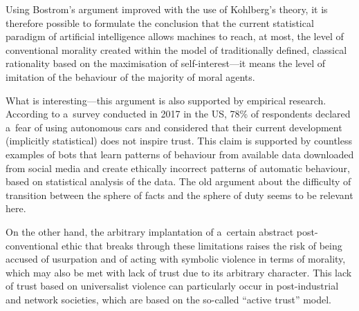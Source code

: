 Using Bostrom's argument improved with the use of Kohlberg's theory, it is therefore possible to formulate the conclusion that the current statistical paradigm of artificial intelligence allows machines to reach, at most, the level of conventional morality created within the model of traditionally defined, classical rationality based on the maximisation of self-interest—it means the level of imitation of the behaviour of the majority of moral agents.

What is interesting—this argument is also supported by empirical research. According to a~survey conducted in 2017 in the US, 78\% of respondents declared a~fear of using autonomous cars
\parencite[][]{edmonds_americans_2017} %
 and considered that their current development (implicitly statistical) does not inspire trust. This claim is supported by countless examples of bots that learn patterns of behaviour from available data downloaded from social media and create ethically incorrect patterns of automatic behaviour, based on statistical analysis of the data. The old argument about the difficulty of transition between the sphere of facts and the sphere of duty seems to be relevant here.

On the other hand, the arbitrary implantation of a~certain abstract post-conventional ethic that breaks through these limitations raises the risk of being accused of usurpation and of acting with symbolic violence in terms of morality, which may also be met with lack of trust due to its arbitrary character. This lack of trust based on universalist violence can particularly occur in post-industrial and network societies, which are based on the so-called ``active trust'' model.

